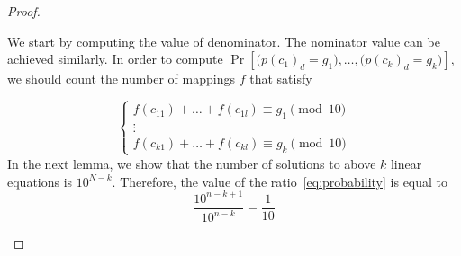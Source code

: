 \documentclass{article}
\begin{document}
\begin{proof}
\begin{itemize}
	We start by computing the value of denominator. The nominator value can be achieved similarly. In order to compute $\Pr[\big(p(c_1)_d=g_1\big),\ldots, \big(p(c_k)_d=g_k\big)]$, we should count the number of mappings $f$ that satisfy 
	
	\begin{equation}
	\label{linearSet}
	\left\{ \begin{array}{l}
     f(c_{11})+\ldots+ f(c_{1l})\equiv g_1 \pmod{10}\\
     \vdots       \\
     f(c_{k1})+\ldots+ f(c_{kl})\equiv g_{k} \pmod{10}
    \end{array} \right.	
	\end{equation}
In the next lemma, we show that the number of solutions to above $k$ linear equations is $10^{N-{k}}$. Therefore, the value of the ratio~\eqref{eq:probability} is equal to
$$
\frac{10^{n-{k+1}}}{10^{n-k}} = \frac{1}{10}
$$
\end{itemize}
\end{proof}
\end{document}
